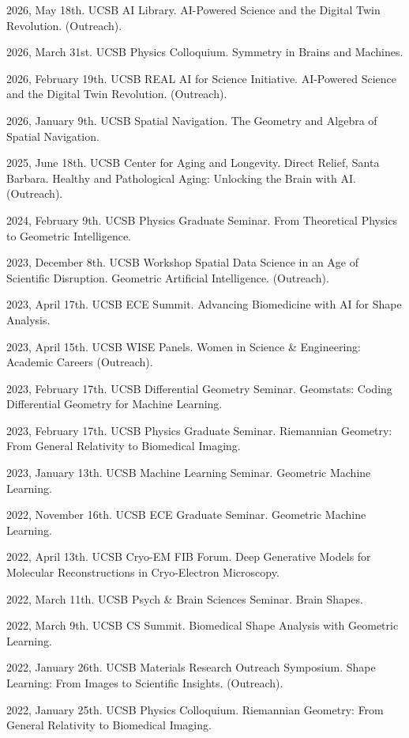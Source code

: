2026, May 18th. UCSB AI Library. AI-Powered Science and the Digital Twin Revolution. (Outreach).

2026, March 31st. UCSB Physics Colloquium. Symmetry in Brains and Machines.

2026, February 19th. UCSB REAL AI for Science Initiative. AI-Powered Science and the Digital Twin Revolution. (Outreach).

2026, January 9th. UCSB Spatial Navigation. The Geometry and Algebra of Spatial Navigation.

2025, June 18th. UCSB Center for Aging and Longevity. Direct Relief, Santa Barbara. Healthy and Pathological Aging: Unlocking the Brain with AI. (Outreach).

2024, February 9th. UCSB Physics Graduate Seminar. From Theoretical Physics to Geometric Intelligence.

2023, December 8th. UCSB Workshop Spatial Data Science in an Age of Scientific Disruption. Geometric Artificial Intelligence. (Outreach).

2023, April 17th. UCSB ECE Summit. Advancing Biomedicine with AI for Shape Analysis.

2023, April 15th. UCSB WISE Panels. Women in Science \& Engineering: Academic Careers (Outreach).

2023, February 17th. UCSB Differential Geometry Seminar. Geomstats: Coding Differential Geometry for Machine Learning.

2023, February 17th. UCSB Physics Graduate Seminar. Riemannian Geometry: From General Relativity to Biomedical Imaging.

2023, January 13th. UCSB Machine Learning Seminar. Geometric Machine Learning.

2022, November 16th. UCSB ECE Graduate Seminar. Geometric Machine Learning.

2022, April 13th. UCSB Cryo-EM FIB Forum. Deep Generative Models for Molecular Reconstructions in Cryo-Electron Microscopy.

2022, March 11th. UCSB Psych \& Brain Sciences Seminar. Brain Shapes.

2022, March 9th. UCSB CS Summit. Biomedical Shape Analysis with Geometric Learning.

2022, January 26th. UCSB Materials Research Outreach Symposium. Shape Learning: From Images to Scientific Insights. (Outreach).

2022, January 25th. UCSB Physics Colloquium. Riemannian Geometry: From General Relativity to Biomedical Imaging.


